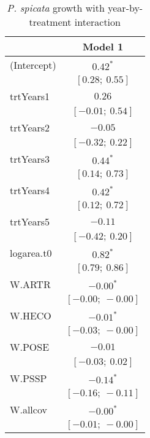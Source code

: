 \documentclass[11pt]{article}
\begin{document}
\begin{table}
\caption{\textit{P. spicata} growth with year-by-treatment interaction}
\begin{center}
\begin{tabular}{l c }
\hline
 & Model 1 \\
\hline
(Intercept)                      & $0.42^{*}$        \\
                                 & $[0.28;\ 0.55]$   \\
trtYears1                        & $0.26$            \\
                                 & $[-0.01;\ 0.54]$  \\
trtYears2                        & $-0.05$           \\
                                 & $[-0.32;\ 0.22]$  \\
trtYears3                        & $0.44^{*}$        \\
                                 & $[0.14;\ 0.73]$   \\
trtYears4                        & $0.42^{*}$        \\
                                 & $[0.12;\ 0.72]$   \\
trtYears5                        & $-0.11$           \\
                                 & $[-0.42;\ 0.20]$  \\
logarea.t0                       & $0.82^{*}$        \\
                                 & $[0.79;\ 0.86]$   \\
W.ARTR                           & $-0.00^{*}$       \\
                                 & $[-0.00;\ -0.00]$ \\
W.HECO                           & $-0.01^{*}$       \\
                                 & $[-0.03;\ -0.00]$ \\
W.POSE                           & $-0.01$           \\
                                 & $[-0.03;\ 0.02]$  \\
W.PSSP                           & $-0.14^{*}$       \\
                                 & $[-0.16;\ -0.11]$ \\
W.allcov                         & $-0.00^{*}$       \\
                                 & $[-0.01;\ -0.00]$ \\

\end{tabular}
\end{center}
\end{table}
\end{document}
